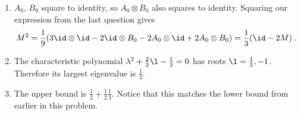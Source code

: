 \begin{exercises}
\begin{enumerate}
\item 
{}
$A_0$, $B_0$ square to identity, so $A_0\otimes B_0$ also squares to identity. 
	Squaring our expression from the last question gives
	\[
	M^2 = \frac19(
	3\id\otimes \id - 2\id\otimes B_0 -2A_0\otimes \id +2A_0\otimes B_0
	) = \frac13(\id - 2M)\;.
	\]
	
\item The characteristic polynomial $\lambda^2 + \frac23 \l - \frac13 = 0$ has roots $\l = \frac13, -1$. Therefore its largest eigenvalue is $\frac 13$.

\item The upper bound is $\frac12 + \frac12\frac13$. Notice that this matches the lower bound from earlier in this problem.
\end{enumerate}
\end{exercises}